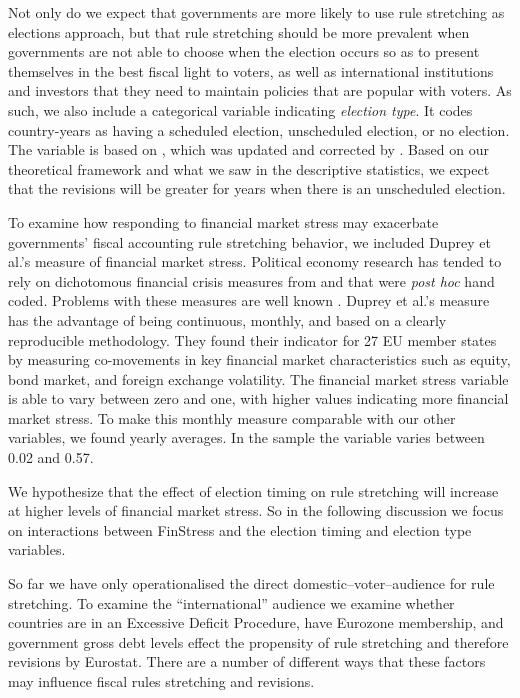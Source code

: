 \documentclass[]{article}
\begin{document}
Not only do we expect that governments are more likely to use rule stretching as elections approach, but that rule stretching should be more prevalent when governments are not able to choose when the election occurs so as to present themselves in the best fiscal light to voters, as well as international institutions and investors that they need to maintain policies that are popular with voters. As such, we also include a categorical variable indicating \emph{election type}. It codes country-years as having a scheduled election, unscheduled election, or no election. The variable is based on \cite{Brender2008}, which was updated and corrected by \cite{hallerbergWehner2015}. Based on our theoretical framework and what we saw in the descriptive statistics, we expect that the revisions will be greater for years when there is an unscheduled election.

To examine how responding to financial market stress may exacerbate governments' fiscal accounting rule stretching behavior, we included Duprey et al.'s \citeyearpar{ThibautDuprey2015} measure of financial market stress. Political economy research has tended to rely on dichotomous financial crisis measures from \cite{Laeven2012} and \cite{ReinhartRog2010} that were \emph{post hoc} hand coded. Problems with these measures are well known \citep[see][]{finstress_paper}. Duprey et al.'s measure has the advantage of being continuous, monthly, and based on a clearly reproducible methodology. They found their indicator for 27 EU member states by measuring co-movements in key financial market characteristics such as equity, bond market, and foreign exchange volatility. The financial market stress variable is able to vary between zero and one, with higher values indicating more financial market stress. To make this monthly measure comparable with our other variables, we found yearly averages. In the sample the variable varies between 0.02 and 0.57.

We hypothesize that the effect of election timing on rule stretching will increase at higher levels of financial market stress. So in the following discussion we focus on interactions between FinStress and the election timing and election type variables.

So far we have only operationalised the direct domestic--voter--audience for rule stretching. To examine the ``international'' audience we examine whether countries are in an Excessive Deficit Procedure, have Eurozone membership, and government gross debt levels effect the propensity of rule stretching and therefore revisions by Eurostat. There are a number of different ways that these factors may influence fiscal rules stretching and revisions.
\end{document}
